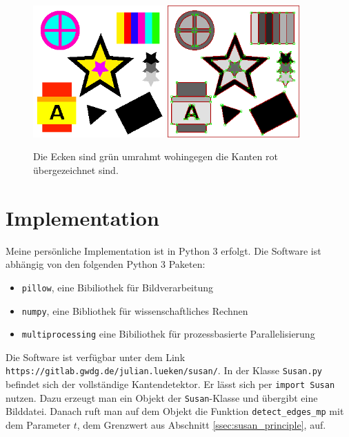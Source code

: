 \documentclass[a4paper, 11pt]{report}
\theoremstyle{definition}
\begin{document}
			\begin{figure}[H]\centering
				\includegraphics[width=0.45\textwidth]{../examples/original/original.png}\quad
				\includegraphics[width=0.45\textwidth]{../examples/original/test_overlay.png}
				\caption{Die Ecken sind grün umrahmt wohingegen die Kanten rot übergezeichnet sind.}
				\label{fig:corner_test}
			\end{figure}

		\section{Implementation}\label{sec:implementation}
		Meine persönliche Implementation ist in Python 3 erfolgt. Die Software ist abhängig von den folgenden Python 3 Paketen:
		\begin{itemize}
			\item \texttt{pillow}, eine Bibiliothek für Bildverarbeitung \cite{pillow}
			\item \texttt{numpy}, eine Bibliothek für wissenschaftliches Rechnen \cite{numpy}
			\item \texttt{multiprocessing} eine Bibiliothek für prozessbasierte Parallelisierung  \cite{multiprocessing}
		\end{itemize}
		Die Software ist verfügbar unter dem Link \texttt{https://gitlab.gwdg.de/julian.lueken/susan/}. In der Klasse \texttt{Susan.py} befindet sich der vollständige Kantendetektor. Er lässt sich per \texttt{import Susan} nutzen. Dazu erzeugt man ein Objekt der \texttt{Susan}-Klasse und übergibt eine Bilddatei. Danach ruft man auf dem Objekt die Funktion \texttt{detect\_edges\_mp} mit dem Parameter $t$, dem Grenzwert aus Abschnitt \ref{ssec:susan_principle}, auf.
\end{document}
